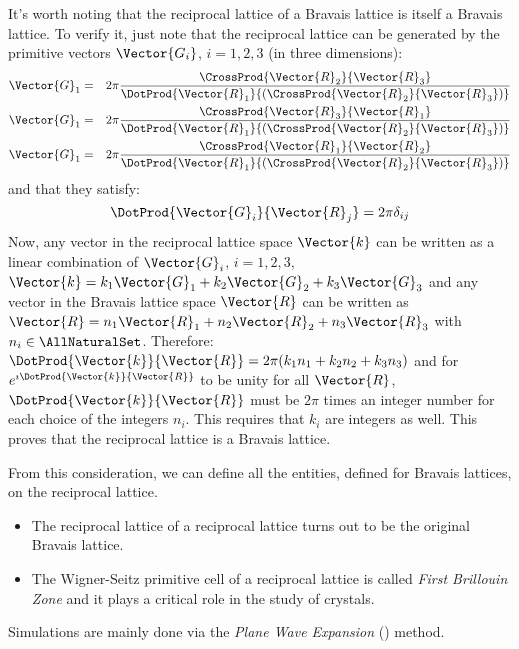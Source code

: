 It's worth noting that the reciprocal lattice of a Bravais lattice is
itself a Bravais lattice. To verify it, just note that the reciprocal
lattice can be generated by the primitive vectors $\Vector{G_i}$, $i =
1,2,3$ (in three dimensions):
\begin{eqnarray*}
\Vector{G}_1 & = & 2 \pi
\frac{\CrossProd{\Vector{R}_2}{\Vector{R}_3}}{\DotProd{\Vector{R}_1}{(\CrossProd{\Vector{R}_2}{\Vector{R}_3})}} \\
\Vector{G}_1 & = & 2 \pi
\frac{\CrossProd{\Vector{R}_3}{\Vector{R}_1}}{\DotProd{\Vector{R}_1}{(\CrossProd{\Vector{R}_2}{\Vector{R}_3})}} \\
\Vector{G}_1 & = & 2 \pi
\frac{\CrossProd{\Vector{R}_1}{\Vector{R}_2}}{\DotProd{\Vector{R}_1}{(\CrossProd{\Vector{R}_2}{\Vector{R}_3})}}
\end{eqnarray*}
and that they satisfy:
$$
\DotProd{\Vector{G}_i}{\Vector{R}_j} = 2 \pi \delta_{ij}
$$
Now, any vector in the reciprocal lattice space $\Vector{k}$ can be
written as a linear combination of $\Vector{G}_i$, $i = 1,2,3$,
$\Vector{k} = k_1 \Vector{G}_1 + k_2 \Vector{G}_2 + k_3 \Vector{G}_3$
and any vector in the Bravais lattice space $\Vector{R}$ can be
written as $\Vector{R} = n_1 \Vector{R}_1 + n_2 \Vector{R}_2 + n_3
\Vector{R}_3$ with $n_i \in \AllNaturalSet$. Therefore:
$\DotProd{\Vector{k}}{\Vector{R}} = 2 \pi (k_1 n_1 + k_2 n_2 + k_3
n_3)$ and for $e^{\imath \DotProd{\Vector{k}}{\Vector{R}}}$ to be
unity for all $\Vector{R}$, $\DotProd{\Vector{k}}{\Vector{R}}$ must be
$2 \pi$ times an integer number for each choice of the integers
$n_i$. This requires that $k_i$ are integers as well. This proves that
the reciprocal lattice is a Bravais lattice.

From this consideration, we can define all the entities, defined for
Bravais lattices, on the reciprocal lattice.
\begin{itemize}
\item
  The reciprocal lattice of a reciprocal lattice turns out to be the original
  Bravais lattice.
\item
  The Wigner-Seitz primitive cell of a reciprocal lattice is called
  \emph{First Brillouin Zone} and it plays a critical role in the
  study of crystals.
\end{itemize}

Simulations are mainly done via the \emph{Plane Wave Expansion}
() method.

